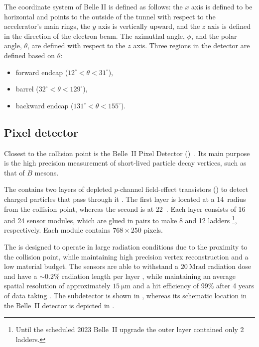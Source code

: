 \vspace{-12pt}
The coordinate system of Belle II is defined as follows: the $x$ axis is defined to be horizontal and points to the outside of the tunnel with respect to the accelerator's
main rings, the $y$ axis is vertically upward, and the $z$ axis is defined in the direction of the electron beam. 
The azimuthal angle, $\phi$, and the polar angle, $\theta$, are defined with respect to the $z$ axis. 
Three regions in the detector are defined based on $\theta$: 
\begin{itemize}
    \item forward endcap (\mbox{$12^{\circ}<\theta<31^{\circ}$}), 
    \item barrel (\mbox{$32^{\circ}<\theta<129^{\circ}$}),
    \item backward endcap (\mbox{$131^{\circ}<\theta<155^{\circ}$}).
\end{itemize}


\subsection{Pixel detector}\label{sec:pxd}

Closest to the collision point is the Belle~II Pixel Detector (\PXD)~\cite{Belle-II:2010dht}.
Its main purpose is the high precision measurement of short-lived particle decay vertices, such as that of $B$ mesons.

The \PXD contains two layers of depleted $p$-channel field-effect transistors (\DEPFET) to detect charged particles that pass through it \cite{Kemmer:1986vh}.
The first layer is located at a 14~\mm radius from the collision point, whereas the second is at 22~\mm.
Each layer consists of 16 and 24 sensor modules, which are glued in pairs to make 8 and 12 ladders
\footnote{Until the scheduled 2023 Belle~II upgrade the outer layer contained only 2 ladders.}, respectively.
Each module contains $768\times250$ \DEPFET pixels.

The \PXD is designed to operate in large radiation conditions due to the proximity to the collision point,
while maintaining high precision vertex reconstruction and a low material budget.
The sensors are able to withstand a $20~\si{\mega\radian}$ 
radiation dose and have a $\sim 0.2\%$ radiation length per layer \cite{Belle-II:2010dht},
while maintaining an average spatial resolution of approximately $15~\si{\micro\meter}$ and a hit efficiency of 99\% after 4 years of data taking \cite{Belle-IIDEPFET:2022wis}.
The subdetector is shown in , whereas its schematic location in the Belle~II detector is depicted in .

